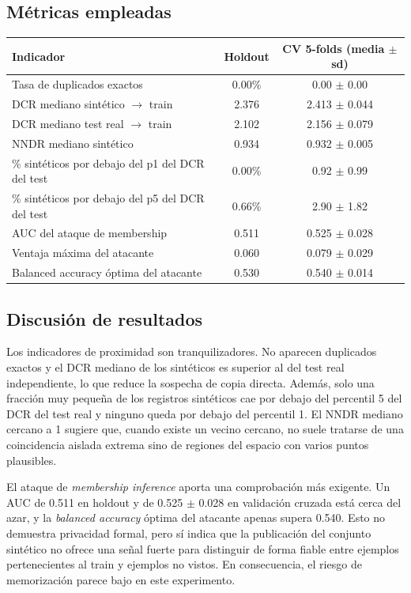 \documentclass[11pt,a4paper]{article}
\begin{document}
\subsection*{Métricas empleadas}
\begin{table}[H]
\centering
\small
\renewcommand{\arraystretch}{1.2}
\begin{tabular}{p{7.2cm}cc}
\toprule
\textbf{Indicador} & \textbf{Holdout} & \textbf{CV 5-folds (media $\pm$ sd)} \\
\midrule
Tasa de duplicados exactos & 0.00\% & 0.00 $\pm$ 0.00 \\
DCR mediano sintético $\rightarrow$ train & 2.376 & 2.413 $\pm$ 0.044 \\
DCR mediano test real $\rightarrow$ train & 2.102 & 2.156 $\pm$ 0.079 \\
NNDR mediano sintético & 0.934 & 0.932 $\pm$ 0.005 \\
\% sintéticos por debajo del p1 del DCR del test & 0.00\% & 0.92 $\pm$ 0.99 \\
\% sintéticos por debajo del p5 del DCR del test & 0.66\% & 2.90 $\pm$ 1.82 \\
AUC del ataque de membership & 0.511 & 0.525 $\pm$ 0.028 \\
Ventaja máxima del atacante & 0.060 & 0.079 $\pm$ 0.029 \\
Balanced accuracy óptima del atacante & 0.530 & 0.540 $\pm$ 0.014 \\
\bottomrule
\end{tabular}
\end{table}

\subsection*{Discusión de resultados}
Los indicadores de proximidad son tranquilizadores. No aparecen duplicados exactos y el DCR mediano de los sintéticos es superior al del test real independiente, lo que reduce la sospecha de copia directa. Además, solo una fracción muy pequeña de los registros sintéticos cae por debajo del percentil 5 del DCR del test real y ninguno queda por debajo del percentil 1. El NNDR mediano cercano a 1 sugiere que, cuando existe un vecino cercano, no suele tratarse de una coincidencia aislada extrema sino de regiones del espacio con varios puntos plausibles.

El ataque de \textit{membership inference} aporta una comprobación más exigente. Un AUC de 0.511 en holdout y de 0.525 $\pm$ 0.028 en validación cruzada está cerca del azar, y la \textit{balanced accuracy} óptima del atacante apenas supera 0.540. Esto no demuestra privacidad formal, pero sí indica que la publicación del conjunto sintético no ofrece una señal fuerte para distinguir de forma fiable entre ejemplos pertenecientes al train y ejemplos no vistos. En consecuencia, el riesgo de memorización parece bajo en este experimento.
\end{document}
